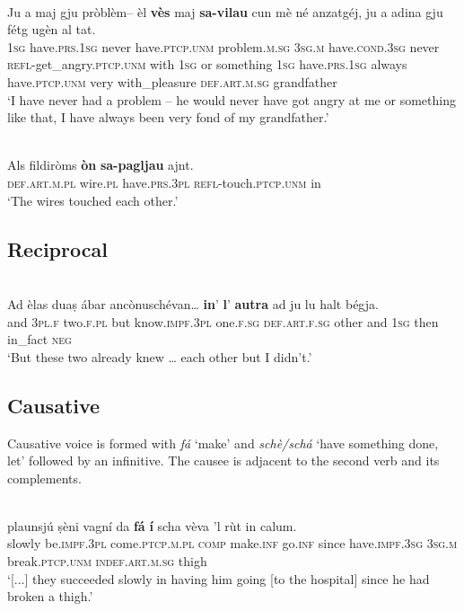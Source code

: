\ea\label{ex:refvaj2}
\\
	\gll Ju a maj gju pròblèm– èl \textbf{vès} maj \textbf{sa-vilau} cun mè né anzatgéj, ju a adina gju fétg ugèn al tat.   \\
	\textsc{1sg} have.\textsc{prs.1sg} never have.\textsc{ptcp.unm} problem.\textsc{m.sg} \textsc{3sg.m} have.\textsc{cond.3sg} never \textsc{refl-}get\_angry.\textsc{ptcp.unm} with \textsc{1sg} or something \textsc{1sg} have.\textsc{prs.1sg} always have.\textsc{ptcp.unm} very with\_pleasure \textsc{def.art.m.sg} grandfather\\
\glt `I have never had a problem – he would never have got angry at me or something like that, I have always been very fond of my grandfather.'
\z

\ea\label{ex:refvaj3}
\\
\gll   Als fildiròms \textbf{òn} \textbf{sa-pagljau} ajnt.\\
    \textsc{def.art.m.pl} wire.\textsc{pl} have.\textsc{prs.3pl} \textsc{refl}-touch.\textsc{ptcp.unm} in \\
\glt `The wires touched each other.'
\z


\subsection{Reciprocal}

\ea\label{}
\\
\gll    Ad èlas duaṣ ábar ancònuschévan… \textbf{in}’ \textbf{l}’ \textbf{autra} ad ju lu halt bégja.\\
and \textsc{3pl.f} two.\textsc{f.pl} but know.\textsc{impf.3pl} one.\textsc{f.sg}  \textsc{def.art.f.sg} other and \textsc{1sg} then in\_fact \textsc{neg}\\
\glt `But these two already knew … each other but I didn’t.'
\z


\subsection{Causative}
Causative voice is formed with \textit{fá} ‘make’ and \textit{schè/schá} `have something done, let' followed by an infinitive. The causee is  adjacent to the second verb and its complements.

\ea\label{}
\\
\gll   [...] plaunsjú ṣèni vagní da \textbf{fá} \textbf{í} scha vèva ’l rùt in calum.\\
{} slowly be.\textsc{impf.3pl} come.\textsc{ptcp.m.pl} \textsc{comp} make.\textsc{inf} go.\textsc{inf} since have.\textsc{impf.3sg} \textsc{3sg.m} break.\textsc{ptcp.unm} \textsc{indef.art.m.sg} thigh \\
\glt `[...] they succeeded slowly in having him going [to the hospital] since he had broken a thigh.'
\z


